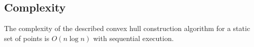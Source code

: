 \documentclass[sigconf]{acmart}
\begin{document}
\subsection{Complexity}


	\begin{theorem}
		The complexity of the described convex hull construction algorithm for a static set of points is $O(n\log n)$ with sequential execution.
	\end{theorem}
\end{document}
